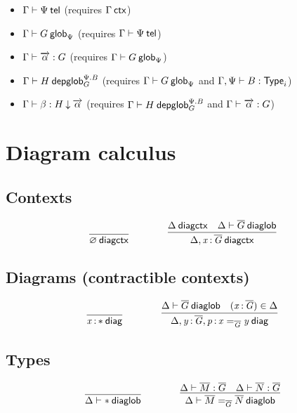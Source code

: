 \begin{itemize}
\item ${\Gamma} \vdash {\Psi} \: \mathsf{tel}$ (requires ${\Gamma} \: \mathsf{ctx}$)
\item ${\Gamma} \vdash {G} \: \mathsf{glob}_{\Psi}$ (requires ${\Gamma} \vdash {\Psi} \: \mathsf{tel}$)
\item ${\Gamma} \vdash {\ensuremath{\overrightarrow{\alpha}}} : {G}$ (requires
  ${\Gamma} \vdash {G} \: \mathsf{glob}_{\Psi}$)
\item ${\Gamma} \vdash {H} \: \mathsf{depglob}^{\Psi.B}_{G}$ (requires ${\Gamma} \vdash {G} \: \mathsf{glob}_{\Psi}$
  and ${\Gamma,\Psi} \vdash {B} : {\mathsf{Type}_{i}}$)
\item ${\Gamma} \vdash {\beta} : {H}\mathbin{\downarrow}{\overrightarrow{\alpha}}$ (requires
  ${\Gamma} \vdash {H} \: \mathsf{depglob}^{\Psi.B}_{G}$ and ${\Gamma} \vdash {\ensuremath{\overrightarrow{\alpha}}} : {G}$)
\end{itemize}

\section{Diagram calculus}

\subsection{Contexts}

\begin{small}
  \[
  \infer{\wfdiagctx{\emptyctx}}{}
  \qquad\qquad
  \infer
  {\wfdiagctx{\Delta,\tptm{x}{\diag G}}}
  {\wfdiagctx{\Delta} & \wfdiaglob{\Delta}{\diag G}}\]
\end{small}

\subsection{Diagrams (contractible contexts)}

\begin{small}
  \[
  \infer{\wfdiag{\tptm{x}{\diagbase}}}{}
  \qquad\qquad
  \infer{\wfdiag{\Delta,\tptm{y}{\diag G},\tptm{p}{\homj{\diag{G}}{x}{y}}}}
  {\wfdiaglob{\Delta}{\diag G}
    & (\tptm{x}{\diag{G}}) \in \Delta}\]
\end{small}

\subsection{Types}

\begin{small}
  \[
  \infer{\wfdiaglob{\Delta}{\diagbase}}
  {}%
  \qquad\qquad
  \infer{\wfdiaglob{\Delta}{\homj{\diag G}{\diag M}{\diag N}}}
  {\ofdiaglob{\Delta}{\diag M}{\diag G}
    & \ofdiaglob{\Delta}{\diag N}{\diag G}}
  \]
\end{small}

